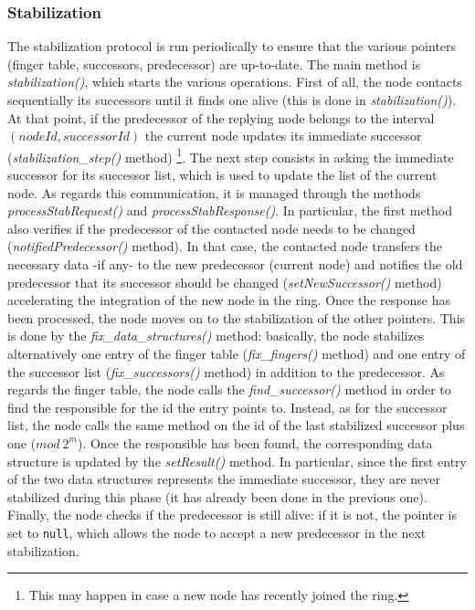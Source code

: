 \documentclass[11pt,twocolumn,letterpaper]{article}
\begin{document}
	\subsubsection{Stabilization}
	\label{subsubsec:stabilization}
	The stabilization protocol is run periodically to ensure that the various pointers (finger table, successors, predecessor) are up-to-date. The main method is \textit{stabilization()}, which starts the various operations. \newline
	First of all, the node contacts sequentially its successors until it finds one alive (this is done in \textit{stabilization()}). At that point, if the predecessor of the replying node belongs to the interval $(nodeId,successorId)$ the current node updates its immediate successor (\textit{stabilization\_step()} method) \footnote{This may happen in case a new node has recently joined the ring.}. The next step consists in asking the immediate successor for its successor list, which is used to update the list of the current node. As regards this communication, it is managed through the methods \textit{processStabRequest()} and \textit{processStabResponse()}. In particular, the first method also verifies if the predecessor of the contacted node needs to be changed  (\textit{notifiedPredecessor()} method). In that case, the contacted node transfers the necessary data -if any- to the new predecessor (current node) and notifies the old predecessor that its successor should be changed (\textit{setNewSuccessor()} method) accelerating the integration of the new node in the ring. \newline
	Once the response has been processed, the node moves on to the stabilization of the other pointers. This is done by the \textit{fix\_data\_structures()} method: basically, the node stabilizes alternatively one entry of the finger table (\textit{fix\_fingers()} method) and one entry of the successor list (\textit{fix\_successors()} method) in addition to the predecessor. As regards the finger table, the node calls the \textit{find\_successor()} method in order to find the responsible for the id the entry points to. Instead, as for the successor list, the node calls the same method on the id of the last stabilized successor plus one ($mod\ 2^m$). Once the responsible has been found, the corresponding data structure is updated by the \textit{setResult()} method. In particular, since the first entry of the two data structures represents the immediate successor, they are never stabilized during this phase (it has already been done in the previous one). Finally, the node checks if the predecessor is still alive: if it is not, the pointer is set to \texttt{null}, which allows the node to accept a new predecessor in the next stabilization.
	
\end{document}
